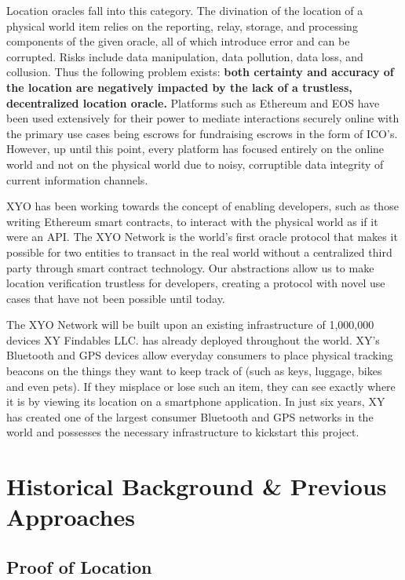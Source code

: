 \documentclass{article}
\begin{document}
Location oracles fall into this category. The divination of the location of a physical world
item relies on the reporting, relay, storage, and processing components of the given oracle,
all of which introduce error and can be corrupted. Risks include data manipulation, data
pollution, data loss, and collusion.
\clearpage
Thus the following problem exists: \textbf{both certainty and accuracy of the location are negatively impacted by the lack of a trustless, decentralized location oracle.} Platforms such as Ethereum and EOS have been used extensively for their power to mediate interactions securely online with the primary use cases being escrows for fundraising escrows in the form of ICO's. However, up until this point, every platform has focused entirely on the online world and not on the physical world due to noisy, corruptible data integrity of current information channels.

XYO has been working towards the concept of enabling developers, such as those writing Ethereum smart contracts, to interact with the physical world as if it were an API. The XYO Network is the world's first oracle protocol that makes it possible for two entities to transact in the real world without a centralized third party through smart contract technology. Our abstractions allow us to make location verification trustless for developers, creating a protocol with novel use cases that have not been possible until today.

The XYO Network will be built upon an existing infrastructure of 1,000,000 devices XY Findables LLC. has already deployed throughout the world. XY's Bluetooth and GPS devices allow everyday consumers to place physical tracking beacons on the things they want to keep track of (such as keys, luggage, bikes and even pets). If they misplace or lose such an item, they can see exactly where it is by viewing its location on a smartphone application. In just six years, XY has created one of the largest consumer Bluetooth and GPS networks in the world and possesses the necessary infrastructure to kickstart this project.

\section{Historical Background \& Previous Approaches}
\subsection{Proof of Location}
\end{document}
